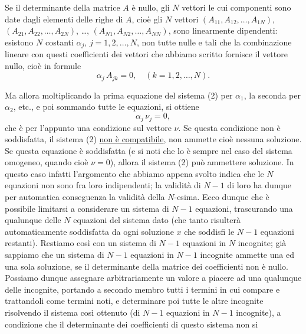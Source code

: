 \documentclass[11pt, a4paper]{book}
\numberwithin{equation}{section}
\begin{document}

Se il determinante della matrice $A$ è nullo, gli $N$ vettori le cui
componenti sono date dagli elementi delle righe di $A$, cioè gli $N$
vettori $(A_{11}, A_{12}, \ldots, A_{1N})$, $(A_{21}, A_{22}, \ldots,
A_{2N})$, \ldots, $(A_{N1}, A_{N2}, \ldots, A_{NN})$, sono linearmente
dipendenti: esistono $N$ costanti $\alpha_j$, $j = 1, 2, \ldots, N$, non
tutte nulle e tali che la combinazione lineare con questi coefficienti dei
vettori che abbiamo scritto fornisce il vettore nullo, cioè in formule
\begin{equation}
\alpha_j\, A_{jk} = 0, \quad (k = 1, 2, \ldots, N).
\end{equation}

Ma allora moltiplicando la prima equazione del sistema (2) per $\alpha_1$,
la seconda per $\alpha_2$, etc., e poi sommando tutte le equazioni, si
ottiene
\begin{equation}
\alpha_j\, \nu_j = 0,
\end{equation}
che è per l'appunto una condizione sul vettore $\nu$. Se questa condizione
non è soddisfatta, il sistema (2) \underline{non è compatibile}, non
ammette cioè nessuna soluzione. Se questa equazione è soddisfatta (e si
noti che lo è sempre nel caso del sistema omogeneo, quando cioè $\nu = 0$),
allora il sistema (2) può ammettere soluzione. In questo caso infatti
l'argomento che abbiamo appena svolto indica che le $N$ equazioni non sono
fra loro indipendenti; la validità di $N-1$ di loro ha dunque per automatica
conseguenza la validità della $N$-esima. Ecco dunque che è possibile
limitarsi a considerare un sistema di $N-1$ equazioni, trascurando una
qualunque delle $N$ equazioni del sistema dato (che tanto risulterà
automaticamente soddisfatta da ogni soluzione $x$ che soddisfi le $N-1$
equazioni restanti). Restiamo così con un sistema di $N-1$ equazioni in $N$
incognite; già sappiamo che un sistema di $N-1$ equazioni in $N-1$%
incognite ammette una ed una sola soluzione, se il determinante della
matrice dei coefficienti non è nullo. Possiamo dunque assegnare
arbitrariamente un valore a piacere ad una qualunque delle incognite,
portando a secondo membro tutti i termini in cui compare e trattandoli come
termini noti, e determinare poi tutte le altre incognite risolvendo il
sistema così ottenuto (di $N-1$ equazioni in $N-1$ incognite), a
condizione che il determinante dei coefficienti di questo sistema non si
\end{document}
